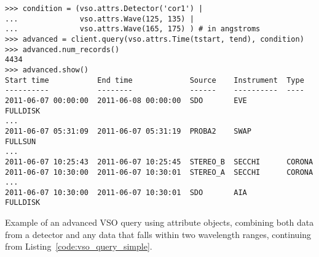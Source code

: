 \begin{listing}[H]
\begin{verbatim}
>>> condition = (vso.attrs.Detector('cor1') |
...              vso.attrs.Wave(125, 135) |
...              vso.attrs.Wave(165, 175) ) # in angstroms
>>> advanced = client.query(vso.attrs.Time(tstart, tend), condition)
>>> advanced.num_records()
4434
>>> advanced.show()
Start time           End time             Source    Instrument  Type
----------           --------             ------    ----------  ----
2011-06-07 00:00:00  2011-06-08 00:00:00  SDO       EVE         FULLDISK
...
2011-06-07 05:31:09  2011-06-07 05:31:19  PROBA2    SWAP        FULLSUN
...
2011-06-07 10:25:43  2011-06-07 10:25:45  STEREO_B  SECCHI      CORONA
2011-06-07 10:30:00  2011-06-07 10:30:01  STEREO_A  SECCHI      CORONA
...
2011-06-07 10:30:00  2011-06-07 10:30:01  SDO       AIA         FULLDISK
\end{verbatim}
\caption{Example of an advanced VSO query using attribute objects,
combining both data from a detector and any data that falls within two wavelength ranges,
continuing from Listing~\ref{code:vso_query_simple}.}
\label{code:vso_query_advanced}
\end{listing}
